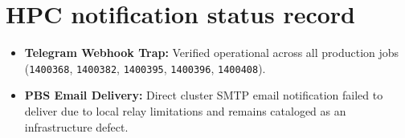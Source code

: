 \section{HPC notification status record}
\begin{itemize}
  \item \textbf{Telegram Webhook Trap:} Verified operational across all production jobs (\texttt{1400368}, \texttt{1400382}, \texttt{1400395}, \texttt{1400396}, \texttt{1400408}).
  \item \textbf{PBS Email Delivery:} Direct cluster SMTP email notification failed to deliver due to local relay limitations and remains cataloged as an infrastructure defect.
\end{itemize}
